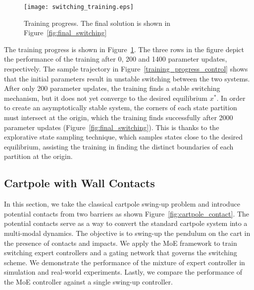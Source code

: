 %
\begin{figure}[tb]
    \centering
    \texttt{[image: switching\_training.eps]}
    \caption{Training progress. The final solution is shown in
    Figure~\ref{fig:final_switching}}
    \label{fig:switching_training}
\end{figure}
%
The training progress is shown in Figure~\ref{fig:switching_training}.
%
The three rows in the figure depict the performance of the training after 0, 200
and 1400 parameter updates, respectively.
%
The sample trajectory in Figure~\ref{training_progress_control} shows that the
initial parameters result in unstable switching between the two systems.
%
After only 200 parameter updates, the training finds a stable switching
mechanism, but it does not yet converge to the desired equilibrium $x^*$.
%
In order to create an asymptotically stable system, the corners of each state
partition must intersect at the origin, which the training finds successfully
after 2000 parameter updates (Figure~\ref{fig:final_switching}).
%
This is thanks to the explorative state sampling technique, which samples states
close to the desired equilibrium, assisting the training in finding the distinct
boundaries of each partition at the origin. 
%


\subsection{Cartpole with Wall Contacts}
\label{ssec:cartpole_with_walls}

In this section, we take the classical cartpole swing-up problem and introduce
potential contacts from two barriers as shown Figure~\ref{fig:cartpole_contact}. 
%
The potential contacts serve as a way to convert the standard cartpole system
into a multi-modal dynamics.
%
The objective is to swing-up the pendulum on the cart in the presence of
contacts and impacts.
%
We apply the MoE framework to train switching expert controllers and a gating
network that governs the switching scheme.
%
We demonstrate the performance of the mixture of expert controller in
simulation and real-world experiments.
%
Lastly, we compare the performance of the MoE controller against
a single swing-up controller. 


